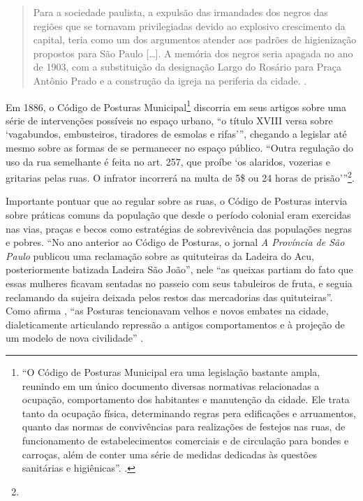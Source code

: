 \begin{refsection}
    \begin{quotation}
        Para a sociedade paulista, a expulsão das irmandades dos negros das regiões que se tornavam privilegiadas devido ao explosivo crescimento da capital, teria como um dos argumentos atender aos padrões de higienização propostos para São Paulo [\dots]. A memória dos negros seria apagada no ano de 1903, com a substituição da designação Largo do Rosário para Praça Antônio Prado e a construção da igreja na periferia da cidade. \cite[p.~181]{Santos2020Igrejas}.
    \end{quotation}

    Em 1886, o Código de Posturas Municipal\footnote{``O Código de Posturas Municipal era uma legislação bastante ampla, reunindo em um único documento diversas normativas relacionadas a ocupação, comportamento dos habitantes e manutenção da cidade. Ele trata tanto da ocupação física, determinando regras pera edificações e arruamentos, quanto das normas de convivências para realizações de festejos nas ruas, de funcionamento de estabelecimentos comerciais e de circulação para bondes e carroças, além de conter uma série de medidas dedicadas às questões sanitárias e higiênicas''. \cite[p.~7--8]{Borin2019Passeios}.} discorria em seus artigos sobre uma série de intervenções possíveis no espaço urbano, ``o título XVIII versa sobre `vagabundos, embusteiros, tiradores de esmolas e rifas'{}'', chegando a legislar até mesmo sobre as formas de se permanecer no espaço público. ``Outra regulação do uso da rua semelhante é feita no art. 257, que proíbe `os alaridos, vozerias e gritarias pelas ruas. O infrator incorrerá na multa de 5\$ ou 24 horas de prisão'{}''\footnote{}.  
    
    Importante pontuar que ao regular sobre as ruas, o Código de Posturas intervia sobre práticas comuns da população que desde o período colonial eram exercidas nas vias, praças e becos como estratégias de sobrevivência das populações negras e pobres. ``No ano anterior ao Código de Posturas, o jornal \textit{A Província de São Paulo} publicou uma reclamação sobre as quituteiras da Ladeira do Acu, posteriormente batizada Ladeira São João'', nele ``as queixas partiam do fato que essas mulheres ficavam sentadas no passeio com seus tabuleiros de fruta, e seguia reclamando da sujeira deixada pelos restos das mercadorias das quituteiras''. Como afirma \textcite{Borin2019Passeios}, ``as Posturas tencionavam velhos e novos embates na cidade, dialeticamente articulando repressão a antigos comportamentos e à projeção de um modelo de nova civilidade'' \cite[p.~12]{Borin2019Passeios}.
    

\end{refsection}
